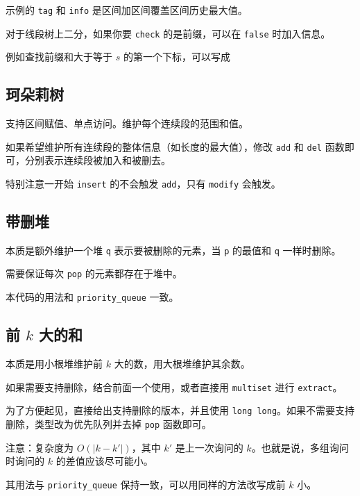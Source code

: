 \documentclass[12pt]{ctexart}
\begin{document}
示例的 \verb|tag| 和 \verb|info| 是区间加区间覆盖区间历史最大值。

对于线段树上二分，如果你要 \verb|check| 的是前缀，可以在 \verb|false| 时加入信息。

例如查找前缀和大于等于 $s$ 的第一个下标，可以写成






\subsection{珂朵莉树}
支持区间赋值、单点访问。维护每个连续段的范围和值。

如果希望维护所有连续段的整体信息（如长度的最大值），修改 \verb|add| 和 \verb|del| 函数即可，分别表示连续段被加入和被删去。

特别注意一开始 \verb|insert| 的不会触发 \verb|add|，只有 \verb|modify| 会触发。



\subsection{带删堆}

本质是额外维护一个堆 \verb|q| 表示要被删除的元素，当 \verb|p| 的最值和 \verb|q| 一样时删除。

需要保证每次 \verb|pop| 的元素都存在于堆中。

本代码的用法和 \verb|priority_queue| 一致。


\subsection{前 $k$ 大的和}

本质是用小根堆维护前 $k$ 大的数，用大根堆维护其余数。

如果需要支持删除，结合前面一个使用，或者直接用 \verb|multiset| 进行 \verb|extract|。

为了方便起见，直接给出支持删除的版本，并且使用 \verb|long long|。如果不需要支持删除，类型改为优先队列并去掉 \verb|pop| 函数即可。

注意：复杂度为 $O(|k-k'|)$，其中 $k'$ 是上一次询问的 $k$。也就是说，多组询问时询问的 $k$ 的差值应该尽可能小。

其用法与 \verb|priority_queue| 保持一致，可以用同样的方法改写成前 $k$ 小。


\end{document}
